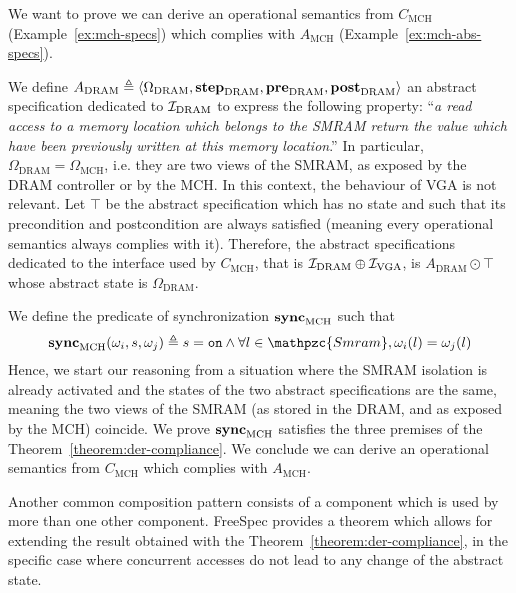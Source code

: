 \begin{example}
  We want to prove we can derive an operational semantics from $C_{\mathrm{MCH}}$
  (Example~\ref{ex:mch-specs}) which complies with $A_{\mathrm{MCH}}$
  (Example~\ref{ex:mch-abs-specs}).

  We define
  $A_{\mathrm{DRAM}} \triangleq \langle \Omega_{\mathrm{DRAM}}, \mathbf{\mathbf{step}}_{\mathrm{DRAM}},
  \mathbf{\mathbf{pre}}_{\mathrm{DRAM}}, \mathbf{\mathbf{post}}_{\mathrm{DRAM}} \rangle$ an abstract specification
  dedicated to $\mathcal{I}_{\mathrm{DRAM}}$ to express the following property: ``\emph{a
  read access to a memory location which belongs to the SMRAM return the value
  which have been previously written at this memory location}.'' In particular,
  $\Omega_{\mathrm{DRAM}} = \Omega_{\mathrm{MCH}}$, i.e. they are two views of
  the SMRAM, as exposed by the DRAM controller or by the MCH.
  In this context, the behaviour of VGA is not relevant. Let $\top$ be the
  abstract specification which has no state and such that its precondition and
  postcondition are always satisfied (meaning every operational semantics always
  complies with it).
  Therefore, the abstract specifications dedicated to the interface used by
  $C_{\mathrm{MCH}}$, that is $\mathcal{I}_{\mathrm{DRAM}} \oplus \mathcal{I}_{\mathrm{VGA}}$, is $A_{\mathrm{DRAM}} \odot \top$ whose
  abstract state is $\Omega_{\mathrm{DRAM}}$.

  We define the predicate of synchronization $\mathbf{\mathbf{sync}}_{\mathrm{MCH}}$ such that
  \[ \func{sync}_{\mathrm{MCH}}(\omega_i, s, \omega_j) \triangleq s = \val{on}
    \wedge \forall l \in \mathpzc{Smram}, \omega_i(l) = \omega_j(l)
  \] Hence, we start our reasoning from a situation where the SMRAM
  isolation is already activated and the states of the two abstract
  specifications are the same, meaning the two views of the SMRAM (as stored in
  the DRAM, and as exposed by the MCH) coincide.
  We prove $\mathbf{\mathbf{sync}}_{\mathrm{MCH}}$ satisfies the three premises of the
  Theorem~\ref{theorem:der-compliance}. We conclude we can derive
  an operational semantics from $C_{\mathrm{MCH}}$ which complies with $A_{\mathrm{MCH}}$.
\end{example}

Another common composition pattern consists of a component which is used by more
than one other component.
%
FreeSpec provides a theorem which allows for extending the result obtained with
the Theorem~\ref{theorem:der-compliance}, in the specific case where concurrent
accesses do not lead to any change of the abstract state.

